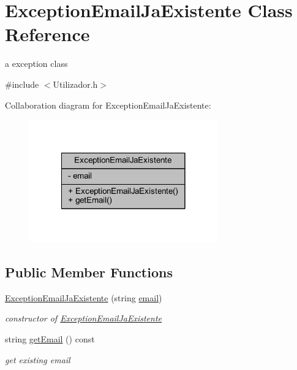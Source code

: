 \hypertarget{class_exception_email_ja_existente}{}\section{Exception\+Email\+Ja\+Existente Class Reference}
\label{class_exception_email_ja_existente}


a exception class  




{\ttfamily \#include $<$Utilizador.\+h$>$}



Collaboration diagram for Exception\+Email\+Ja\+Existente\+:\nopagebreak
\begin{figure}[H]
\begin{center}
\leavevmode
\includegraphics[width=230pt]{class_exception_email_ja_existente__coll__graph}
\end{center}
\end{figure}
\subsection*{Public Member Functions}
\begin{DoxyCompactItemize}
\item 
\hypertarget{class_exception_email_ja_existente_acc86b27775e8955e3506e6bbabf99833}{}\hyperlink{class_exception_email_ja_existente_acc86b27775e8955e3506e6bbabf99833}{Exception\+Email\+Ja\+Existente} (string \hyperlink{class_exception_email_ja_existente_a9c23e110acf753bea69fbf3bfce4ae8c}{email})\label{class_exception_email_ja_existente_acc86b27775e8955e3506e6bbabf99833}

\begin{DoxyCompactList}\small\item\em constructor of \hyperlink{class_exception_email_ja_existente}{Exception\+Email\+Ja\+Existente} \end{DoxyCompactList}\item 
\hypertarget{class_exception_email_ja_existente_ad8807114291847ad8c03d7909193d9d9}{}string \hyperlink{class_exception_email_ja_existente_ad8807114291847ad8c03d7909193d9d9}{get\+Email} () const \label{class_exception_email_ja_existente_ad8807114291847ad8c03d7909193d9d9}

\begin{DoxyCompactList}\small\item\em get existing email \end{DoxyCompactList}\end{DoxyCompactItemize}
